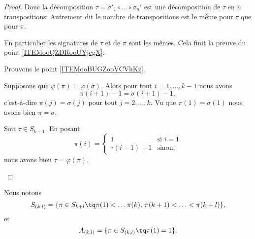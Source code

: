\begin{proof}
	Donc la décomposition \( \tau=\sigma'_1\circ\ldots\circ\sigma_n'\) est une décomposition de \( \tau\) en \( n\) transpositions. Autrement dit le nombre de transpositions est le même pour \( \tau\) que pour \( \pi\).

	En particulier les signatures de \( \tau\) et de \( \pi\) sont les mêmes. Cela finit la preuve du point \ref{ITEMooQZDRooUYjcgX}.

	Prouvons le point \ref{ITEMooBUGZooVCVhKz}.
	\begin{subproof}
		\spitem[Injectif]
		Supposons que \( \varphi(\pi)=\varphi(\sigma)\). Alors pour tout \( i=1,\ldots,k-1\) nous avons
		\begin{equation}
			\pi(i+1)-1=\sigma(i+1)-1,
		\end{equation}
		c'est-à-dire \( \pi(j)=\sigma(j)\) pour tout \( j=2,\ldots,k\). Vu que \( \pi(1)=\sigma(1)\) nous avons bien \( \pi=\sigma\).

		\spitem[Surjectif]
		Soit \( \tau\in S_{k-1}\). En posant
		\begin{equation}
			\pi(i)=\begin{cases}
				1           & \text{si } i=1 \\
				\tau(i-1)+1 & \text{sinon, }
			\end{cases}
		\end{equation}
		nous avons bien \( \tau=\varphi(\pi)\).
	\end{subproof}
\end{proof}

\begin{definition}		\label{DEFooDFBEooFElghU}
	Nous notons
	\begin{equation}
		S_{(k,l)}=\{ \pi\in S_{k+l}\tq \pi(1)<\ldots \pi(k),\,\pi(k+1)<\ldots<\pi(k+l) \},
	\end{equation}
	et
	\begin{equation}
		A_{(k,l)}=\{ \pi\in S_{(k,l)}\tq \pi(1)=1 \}.
	\end{equation}
\end{definition}

